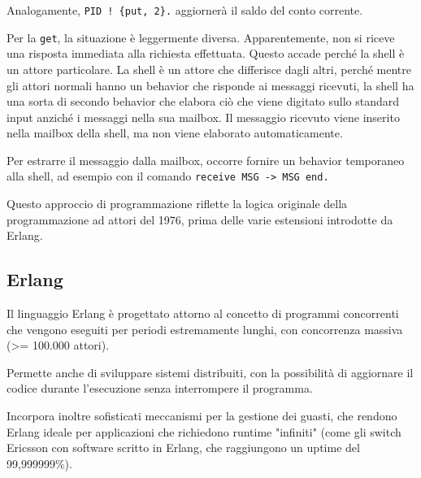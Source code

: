 \documentclass{article}
\begin{document}
Analogamente, \texttt{PID ! \{put, 2\}.} aggiornerà il saldo del conto corrente.

Per la \texttt{get}, la situazione è leggermente diversa. Apparentemente, non si riceve una risposta immediata alla richiesta effettuata. Questo accade perché la shell è un attore particolare. La shell è un attore che differisce dagli altri, perché mentre gli attori normali hanno un behavior che risponde ai messaggi ricevuti, la shell ha una sorta di secondo behavior che elabora ciò che viene digitato sullo standard input anziché i messaggi nella sua mailbox. Il messaggio ricevuto viene inserito nella mailbox della shell, ma non viene elaborato automaticamente.

Per estrarre il messaggio dalla mailbox, occorre fornire un behavior temporaneo alla shell, ad esempio con il comando \texttt{receive MSG -> MSG end.}

Questo approccio di programmazione riflette la logica originale della programmazione ad attori del 1976, prima delle varie estensioni introdotte da Erlang.

\subsection*{Erlang}
Il linguaggio Erlang è progettato attorno al concetto di programmi concorrenti che vengono eseguiti per periodi estremamente lunghi, con concorrenza massiva (>= 100.000 attori).

Permette anche di sviluppare sistemi distribuiti, con la possibilità di aggiornare il codice durante l'esecuzione senza interrompere il programma.

Incorpora inoltre sofisticati meccanismi per la gestione dei guasti, che rendono Erlang ideale per applicazioni che richiedono runtime "infiniti" (come gli switch Ericsson con software scritto in Erlang, che raggiungono un uptime del 99,999999\%).\vspace{14pt}\\
\end{document}
